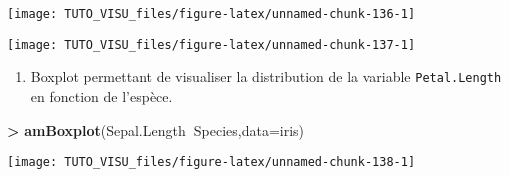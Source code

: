 \documentclass[]{article}
\newenvironment{Shaded}{\begin{snugshade}}{\end{snugshade}}
\newcommand{\DataTypeTok}[1]{\textcolor[rgb]{0.13,0.29,0.53}{#1}}
\newcommand{\KeywordTok}[1]{\textcolor[rgb]{0.13,0.29,0.53}{\textbf{#1}}}
\newcommand{\NormalTok}[1]{#1}
\newcommand{\OperatorTok}[1]{\textcolor[rgb]{0.81,0.36,0.00}{\textbf{#1}}}
\newcommand{\StringTok}[1]{\textcolor[rgb]{0.31,0.60,0.02}{#1}}
\providecommand{\tightlist}{%
  \setlength{\itemsep}{0pt}\setlength{\parskip}{0pt}}
\theoremstyle{definition}
\theoremstyle{definition}
\theoremstyle{definition}
\theoremstyle{remark}
\begin{document}
\begin{center}\texttt{[image: TUTO\_VISU\_files/figure-latex/unnamed-chunk-136-1]} \end{center}

\begin{Shaded}
\end{Shaded}

\begin{center}\texttt{[image: TUTO\_VISU\_files/figure-latex/unnamed-chunk-137-1]} \end{center}

\begin{enumerate}
\def\labelenumi{\arabic{enumi}.}
\setcounter{enumi}{1}
\tightlist
\item
  Boxplot permettant de visualiser la distribution de la variable \texttt{Petal.Length} en fonction de l'espèce.
\end{enumerate}

\begin{Shaded}
\begin{Highlighting}[]
\OperatorTok{>}\StringTok{ }\KeywordTok{amBoxplot}\NormalTok{(Sepal.Length}\OperatorTok{~}\NormalTok{Species,}\DataTypeTok{data=}\NormalTok{iris)}
\end{Highlighting}
\end{Shaded}

\begin{center}\texttt{[image: TUTO\_VISU\_files/figure-latex/unnamed-chunk-138-1]} \end{center}

\begin{Shaded}
\end{Shaded}
\end{document}
